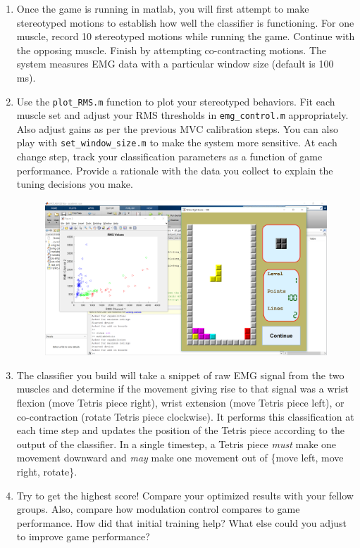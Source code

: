 \documentclass[10pt,oneside,a4paper]{article}
\begin{document}
\begin{enumerate}
\item Once the game is running in matlab, you will first attempt to make stereotyped motions to establish how well the classifier is functioning.  For one muscle, record 10 stereotyped motions while running the game.  Continue with the opposing muscle.  Finish by attempting co-contracting motions.  The system measures EMG data with a particular window size (default is 100 ms).  
\item Use the \texttt{plot\_RMS.m} function to plot your stereotyped behaviors. Fit each muscle set and adjust your RMS thresholds in \texttt{emg\_control.m} appropriately.  Also adjust gains as per the previous MVC calibration steps.  You can also play with \texttt{set\_window\_size.m} to make the system more sensitive.  At each change step, track your classification parameters as a function of game performance.  Provide a rationale with the data you collect to explain the tuning decisions you make.
\begin{figure}[H]
\includegraphics[width=\textwidth]{tetris_game.PNG}
\end{figure}
\item The classifier you build will take a snippet of raw EMG signal from the two muscles and determine if the movement giving rise to that signal was a wrist flexion (move Tetris piece right), wrist extension (move Tetris piece left), or co-contraction (rotate Tetris piece clockwise). It performs this classification at each time step and updates the position of the Tetris piece according to the output of the classifier. In a single timestep, a Tetris piece \textit{must} make one movement downward and \textit{may} make one movement out of \{move left, move right, rotate\}.
\item Try to get the highest score!  Compare your optimized results with your fellow groups.  Also, compare how modulation control compares to game performance.  How did that initial training help?  What else could you adjust to improve game performance?
\end{enumerate}
\end{document}

